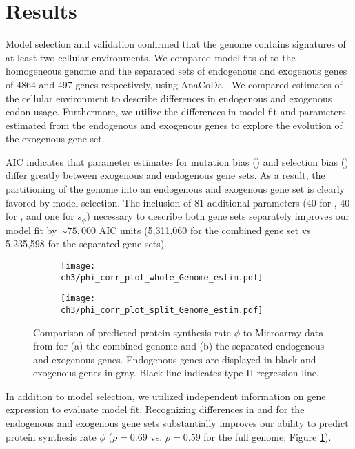 \section{Results}
Model selection and validation confirmed that the \kluyveri genome contains signatures of at least two cellular environments.
We compared model fits of \ROC to the homogeneous \kluyveri genome and the separated sets of endogenous and exogenous genes of 4864 and 497 genes respectively, using AnaCoDa \citep{landerer2018}.
We compared estimates of the cellular environment to describe differences in endogenous and exogenous codon usage.
Furthermore, we utilize the differences in model fit and parameters estimated from the endogenous and exogenous genes to explore the evolution of the exogenous gene set.

AIC indicates that parameter estimates for mutation bias (\DM) and selection bias (\DE) differ greatly between exogenous and endogenous gene sets.
As a result, the partitioning of the \kluyveri genome into an endogenous and exogenous gene set is clearly favored by model selection.
The inclusion of 81 additional parameters ($40$ for \DM, $40$ for \DE, and one for $s_{\phi}$) necessary to describe both gene sets separately improves our model fit by $\sim 75,000$ AIC units (5,311,060 for the combined gene set vs 5,235,598 for the separated gene sets).

\begin{figure}[t]
    \centering
    \begin{subfigure}
        \centering
        \texttt{[image: ch3/phi\_corr\_plot\_whole\_Genome\_estim.pdf]}
    \end{subfigure}
    \begin{subfigure}
        \centering
        \texttt{[image: ch3/phi\_corr\_plot\_split\_Genome\_estim.pdf]}
    \end{subfigure}
    \caption{Comparison of predicted protein synthesis rate $\phi$ to Microarray data from \citet{tsankov2010} for (a) the combined genome and (b) the separated endogenous and exogenous genes. 
    Endogenous genes are displayed in black and exogenous genes in gray. Black line indicates type II regression line.}
    \label{fig:phi_corr_two_cond}
\end{figure}

In addition to model selection, we utilized independent information on gene expression to evaluate model fit.
Recognizing differences in \DM and \DE for the endogenous and exogenous gene sets substantially improves our ability to predict protein synthesis rate $\phi$ ($\rho = 0.69$ vs. $\rho = 0.59$ for the full genome;  Figure \ref{fig:phi_corr_two_cond}).

